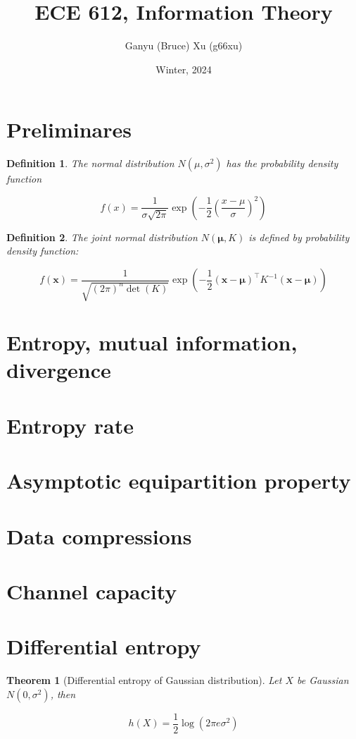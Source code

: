 \documentclass{article}
\title{ECE 612, Information Theory}
\author{Ganyu (Bruce) Xu (g66xu)}
\date{Winter, 2024}
\newtheorem{definition}{Definition}[section]
\newtheorem{theorem}{Theorem}[section]
\begin{document}
\maketitle

\section*{Preliminares}
\begin{definition}
    The normal distribution $N(\mu, \sigma^2)$ has the probability density function

    $$
    f(x) = \frac{1}{\sigma\sqrt{2\pi}}\exp(-\frac{1}{2}(\frac{x-\mu}{\sigma})^2)
    $$
\end{definition}

\begin{definition}
    The joint normal distribution $N(\mathbf{\mu}, K)$ is defined by probability density function:

    $$
    f(\mathbf{x}) = \frac{1}{\sqrt{(2\pi)^n\det(K)}}
    \exp(-\frac{1}{2}
        (\mathbf{x} - \mathbf{\mu})^\intercal
        K^{-1}
        (\mathbf{x} - \mathbf{\mu})
    )
    $$
\end{definition}

\section{Entropy, mutual information, divergence}

\section{Entropy rate}

\section{Asymptotic equipartition property}

\section{Data compressions}

\section{Channel capacity}

\section{Differential entropy}
\begin{theorem}[Differential entropy of Gaussian distribution]
    Let $X$ be Gaussian $N(0, \sigma^2)$, then

    $$
    h(X) = \frac{1}{2}\log{(2\pi e \sigma^2)}
    $$
\end{theorem}
\end{document}

